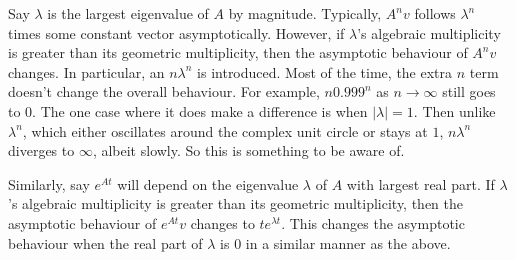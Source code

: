 \documentclass[11pt]{article}
\theoremstyle{plain} %
\theoremstyle{definition}
\theoremstyle{remark}
\begin{document}
Say $\lambda$ is the largest eigenvalue of $A$ by magnitude. Typically, $A^n v$ follows $\lambda^n$ times some constant vector asymptotically. However, if $\lambda$'s algebraic multiplicity is greater than its geometric multiplicity, then the asymptotic behaviour of $A^nv$ changes. In particular, an $n \lambda^n$ is introduced. Most of the time, the extra $n$ term doesn't change the overall behaviour. For example, $n 0.999^n$ as $n\to \infty$ still goes to $0$. The one case where it does make a difference is when $|\lambda| = 1$. Then unlike $\lambda^n$, which either oscillates around the complex unit circle or stays at $1$, $n \lambda^n$ diverges to $\infty$, albeit slowly. So this is something to be aware of.

Similarly, say $e^{At}$ will depend on the eigenvalue $\lambda$ of $A$ with largest real part. If $\lambda$'s algebraic multiplicity is greater than its geometric multiplicity, then the asymptotic behaviour of $e^{At}v$ changes to $t e^{\lambda t}$. This changes the asymptotic behaviour when the real part of $\lambda$ is $0$ in a similar manner as the above.
\end{document}
